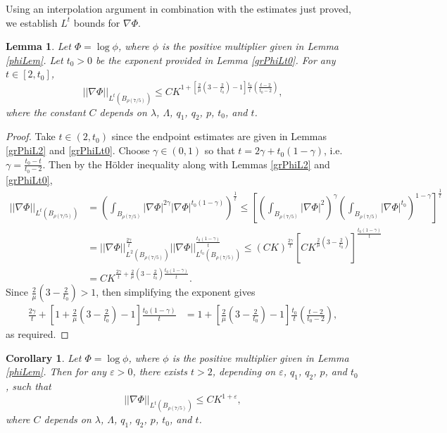 \documentclass[12pt,reqno]{amsart}
\theoremstyle{plain}
\newtheorem{lem}{Lemma}
\newtheorem{cor}{Corollary}
\theoremstyle{definition}
\newcommand{\eps}{\varepsilon}
\newcommand{\ga}{\gamma}
\newcommand{\la}{\lambda}
\newcommand{\La}{\Lambda}
\newcommand{\gr}{\nabla}
\newcommand{\norm}[1]{\left\vert \left\vert #1\right\vert\right\vert}
\newcommand{\abs}[1]{\left\vert#1\right\vert}
\newcommand{\brac}[1]{\left[#1\right]}
\newcommand{\pr}[1]{\left( #1 \right) }
\begin{document}
Using an interpolation argument in combination with the estimates just proved, we establish $L^t$ bounds for $\gr \Phi$.

\begin{lem}
Let $\Phi = \log \phi$, where $\phi$ is the positive multiplier given in Lemma \ref{phiLem}.
Let $t_0 > 0$ be the exponent provided in Lemma \ref{grPhiLt0}.
For any $t \in \brac{2, t_0}$, $$\norm{\gr \Phi}_{L^t\pr{B_{\rho\pr{7/5}}}} \le C K^{1 + \brac{\frac 2 \mu\pr{3 - \frac 2 {t_0}} - 1}{\frac{t_0}{t}}\pr{\frac{t - 2}{t_0 - 2}}},$$ where the constant $C$ depends on $\la$, $\La$, $q_1$, $q_2$, $p$, $t_0$, and $t$.
\end{lem}

\begin{proof}
Take $t \in \pr{2,t_0}$ since the endpoint estimates are given in Lemmas \ref{grPhiL2} and \ref{grPhiLt0}.
Choose $\ga \in \pr{0, 1}$ so that $t = 2 \ga + t_0 \pr{1 - \ga}$, i.e. $\ga = \frac{t_0 - t}{t_0 - 2}$.
Then by the H\"older inequality along with Lemmas \ref{grPhiL2} and \ref{grPhiLt0},
\begin{align*}
\norm{\gr \Phi}_{L^t\pr{B_{\rho\pr{7/5}}}}
&= \pr{\int_{B_{\rho\pr{7/5}}} \abs{\gr \Phi}^{2\ga} \abs{\gr \Phi}^{t_0\pr{1 - \ga}} }^{\frac 1 t} 
\le \brac{\pr{\int_{B_{\rho\pr{7/5}}} \abs{\gr \Phi}^{2}}^{\ga} \pr{ \int_{B_{\rho\pr{7/5}}} \abs{\gr \Phi}^{t_0}}^{1 - \ga} }^{\frac 1 t} \\
&= \norm{\gr \Phi}_{L^2\pr{B_{\rho\pr{7/5}}}}^{\frac{2\ga}{t}}  \norm{\gr \Phi}_{L^{t_0}\pr{B_{\rho\pr{7/5}}}}^{\frac{t_0 \pr{1 - \ga}}{t}}
\le \pr{C K}^{\frac{2\ga}{t}}  \brac{C K^{\frac 2 \mu\pr{3 - \frac 2 {t_0}}}}^{\frac{t_0\pr{1 - \ga}}{t}}  \\
&= C K^{\frac {2\ga} t + \frac 2 \mu\pr{3 - \frac 2 {t_0}}{\frac{t_0\pr{1 - \ga}}{t}} }.
\end{align*}
Since $\frac 2 \mu\pr{3 - \frac 2 {t_0}} > 1$, then simplifying the exponent gives
\begin{align*}
\frac {2\ga} t + \brac{1 + \frac 2 \mu\pr{3 - \frac 2 {t_0}} - 1}{\frac{t_0\pr{1 - \ga}}{t}}
&= 1 + \brac{\frac 2 \mu\pr{3 - \frac 2 {t_0}} - 1} \frac{t_0}{t} \pr{\frac{t - 2}{t_0 - 2}},
\end{align*}
as required.
\end{proof}

\begin{cor}
Let $\Phi = \log \phi$, where $\phi$ is the positive multiplier given in Lemma \ref{phiLem}.
Then for any $\eps > 0$, there exists $t > 2$, depending on $\eps$, $q_1$, $q_2$, $p$, and $t_0$, such that 
\begin{equation}
\norm{\gr \Phi}_{L^t\pr{B_{\rho\pr{7/5}}}} \le C K^{1 + \eps},
\label{PhitBd}
\end{equation}
where $C$ depends on $\la$, $\La$, $q_1$, $q_2$, $p$, $t_0$, and $t$.
\label{PhiepsBound}
\end{cor}
\end{document}
